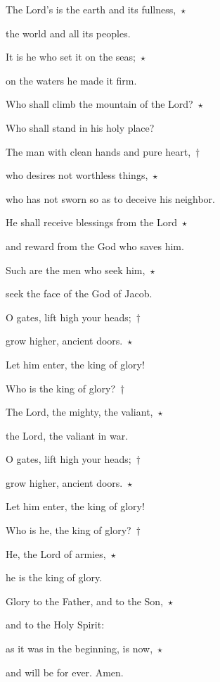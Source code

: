 \noindent The Lord’s is the earth and its fullness,~$\star$~\nopagebreak

the world and all its peoples.

\noindent It is he who set it on the seas;~$\star$~\nopagebreak

on the waters he made it firm.

\noindent Who shall climb the mountain of the Lord?~$\star$~\nopagebreak

Who shall stand in his holy place?

\noindent The man with clean hands and pure heart,~†~\nopagebreak

who desires not worthless things,~$\star$~\nopagebreak

who has not sworn so as to deceive his neighbor.

\noindent He shall receive blessings from the Lord~$\star$~\nopagebreak

and reward from the God who saves him.

\noindent Such are the men who seek him,~$\star$~\nopagebreak

seek the face of the God of Jacob.

\noindent O gates, lift high your heads;~†~\nopagebreak

grow higher, ancient doors.~$\star$~\nopagebreak

Let him enter, the king of glory!

\noindent Who is the king of glory?~†~\nopagebreak

The Lord, the mighty, the valiant,~$\star$~\nopagebreak

the Lord, the valiant in war.

\noindent O gates, lift high your heads;~†~\nopagebreak

grow higher, ancient doors.~$\star$~\nopagebreak

Let him enter, the king of glory!

\noindent Who is he, the king of glory?~†~\nopagebreak

He, the Lord of armies,~$\star$~\nopagebreak

he is the king of glory.

\noindent Glory to the Father, and to the Son,~$\star$~\nopagebreak

and to the Holy Spirit:

\noindent as it was in the beginning, is now,~$\star$~\nopagebreak

and will be for ever. Amen.